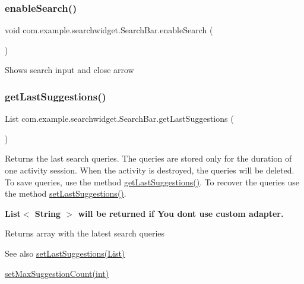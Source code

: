\subsubsection{\texorpdfstring{enableSearch()}{enableSearch()}}
{\footnotesize\ttfamily void com.\+example.\+searchwidget.\+Search\+Bar.\+enable\+Search (\begin{DoxyParamCaption}{ }\end{DoxyParamCaption})}

Shows search input and close arrow \mbox{\label{classcom_1_1example_1_1searchwidget_1_1_search_bar_a29fff6f8fe5011b1854e4fd4a55ea65f}} 
\subsubsection{\texorpdfstring{getLastSuggestions()}{getLastSuggestions()}}
{\footnotesize\ttfamily List com.\+example.\+searchwidget.\+Search\+Bar.\+get\+Last\+Suggestions (\begin{DoxyParamCaption}{ }\end{DoxyParamCaption})}

Returns the last search queries. The queries are stored only for the duration of one activity session. When the activity is destroyed, the queries will be deleted. To save queries, use the method \mbox{\hyperlink{classcom_1_1example_1_1searchwidget_1_1_search_bar_a29fff6f8fe5011b1854e4fd4a55ea65f}{get\+Last\+Suggestions()}}. To recover the queries use the method \mbox{\hyperlink{classcom_1_1example_1_1searchwidget_1_1_search_bar_a36b0bcb2dd221d8cba1b64955a51b597}{set\+Last\+Suggestions()}}. 

{\bfseries{List$<$ String $>$ will be returned if You don\textquotesingle{}t use custom adapter.}}

\begin{DoxyReturn}{Returns}
array with the latest search queries 
\end{DoxyReturn}
\begin{DoxySeeAlso}{See also}
\mbox{\hyperlink{classcom_1_1example_1_1searchwidget_1_1_search_bar_a36b0bcb2dd221d8cba1b64955a51b597}{set\+Last\+Suggestions(\+List)}} 

\mbox{\hyperlink{classcom_1_1example_1_1searchwidget_1_1_search_bar_a0f4236bdaf89946d9bdc0eb982cb7cce}{set\+Max\+Suggestion\+Count(int)}} 
\end{DoxySeeAlso}
\mbox{\label{classcom_1_1example_1_1searchwidget_1_1_search_bar_af3e813af6c49f88e24d593dfa41037be}} 
